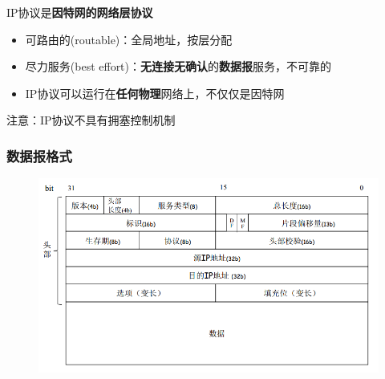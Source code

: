 IP协议是\textbf{因特网的网络层协议}
\begin{itemize}
\item 可路由的(routable)：全局地址，按层分配
\item 尽力服务(best effort)：\textbf{无连接无确认}的\textbf{数据报}服务，不可靠的
\item IP协议可以运行在\textbf{任何物理}网络上，不仅仅是因特网
\end{itemize}
注意：IP协议不具有拥塞控制机制

\subsubsection{数据报格式}
\begin{figure}[H]
	\centering
	\includegraphics[width=0.6\linewidth]{fig/IP_datagram.png}
\end{figure}
